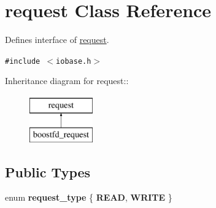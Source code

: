 \hypertarget{classrequest}{
\section{request Class Reference}
\label{classrequest}
}
Defines interface of \hyperlink{classrequest}{request}.  


{\tt \#include $<$iobase.h$>$}

Inheritance diagram for request::\begin{figure}[H]
\begin{center}
\leavevmode
\includegraphics[height=2cm]{classrequest}
\end{center}
\end{figure}
\subsection*{Public Types}
\begin{CompactItemize}
\item 
enum \textbf{request\_\-type} \{ \textbf{READ}, 
\textbf{WRITE}
 \}
\end{CompactItemize}
